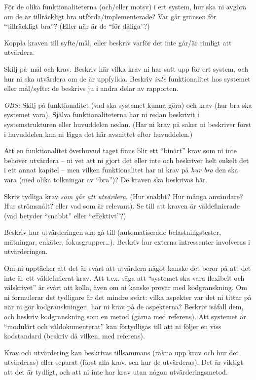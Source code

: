 För de olika funktionaliteterna (och/eller motsv) i ert system, hur ska ni avgöra om de är tillräckligt bra utförda/implementerade? Var går gränsen för ``tillräckligt bra''? (Eller när är de ``för dåliga''?)

Koppla kraven till syfte/mål, eller beskriv varför det inte går/är rimligt att utvärdera.

Skilj på mål och krav. Beskriv här vilka krav ni har satt upp för ert system, och hur ni ska utvärdera om de är uppfyllda. Beskriv \emph{inte} funktionalitet hos systemet eller mål/syfte: de beskrivs ju i andra delar av rapporten.

\emph{OBS:} Skilj på funktionalitet (vad ska systemet kunna göra) och krav (hur bra ska systemet vara). Själva funktionaliteterna har ni redan beskrivit i systemstrukturen eller huvuddelen nedan. (Har ni krav på saker ni beskriver först i huvuddelen kan ni lägga det här avsnittet efter huvuddelen.)

Att en funktionalitet överhuvud taget finns blir ett ``binärt'' krav som ni inte behöver utvärdera -- ni vet att ni gjort det eller inte och beskriver helt enkelt det i ett annat kapitel  -- men vilken funktionalitet har ni krav på \emph{hur bra} den ska vara (med olika tolkningar av ``bra'')? De kraven ska beskrivas här.

Skriv tydliga krav \emph{som går att utvärdera}.  (Hur snabbt? Hur många användare? Hur strömsnålt? eller vad som är relevant). Se till att kraven är väldefinierade (vad betyder ``snabbt'' eller ``effektivt''?)

Beskriv hur utvärderingen ska gå till (automatiserade belastningstester, mätningar, en\-käter, fokusgrupper\ldots).
Beskriv hur externa intressenter involveras i utvärderingen.

Om ni upptäcker att det är svårt att utvärdera något kanske det beror på att det inte är ett väldefinierat krav. Att t.ex. säga att ``systemet ska vara flexibelt och välskrivet'' är svårt att kolla, även om ni kanske provar med kodgranskning.
 Om ni formulerar det tydligare är det mindre svårt: vilka aspekter var det ni tittar på när ni gör kodgranskningen, har ni krav på de aspekterna? Beskriv isåfall dem, och beskriv kodgranskning som en metod (gärna med referens). Att systemet är ``modulärt och väldokumenterat'' kan förtydligas till att ni följer en viss kodstandard (beskriv då vilken, med referens).

Krav och utvärdering kan beskrivas tillsammans (räkna upp krav och hur det utvärderas) eller separat (först alla krav, sen hur de utvärderas). Det är viktigt att det är tydligt, och att ni inte har krav utan någon utvärderingsmetod.

